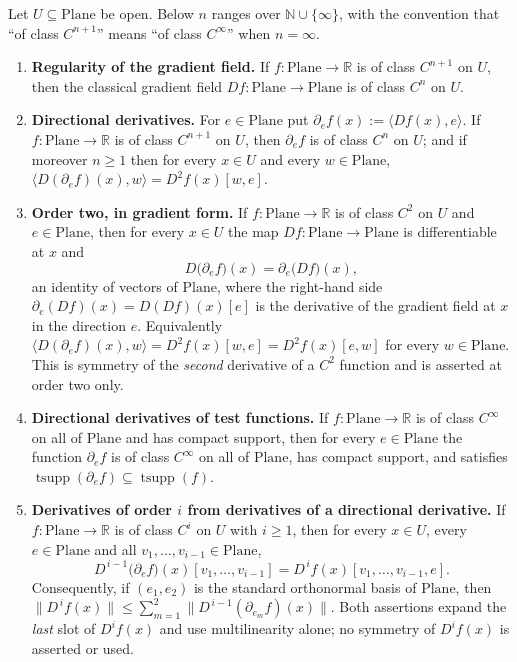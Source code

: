 \begin{proposition}
Let $U\subseteq\mathrm{Plane}$ be open.  Below $n$ ranges over $\mathbb{N}\cup\{\infty\}$, with
the convention that ``of class $C^{n+1}$'' means ``of class $C^{\infty}$'' when $n=\infty$.
\begin{enumerate}
\item \textbf{Regularity of the gradient field.}  If $f\colon\mathrm{Plane}\to\mathbb{R}$ is of
class $C^{n+1}$ on $U$, then the classical gradient field $Df\colon\mathrm{Plane}\to
\mathrm{Plane}$ is of class $C^{n}$ on $U$.
\item \textbf{Directional derivatives.}  For $e\in\mathrm{Plane}$ put
$\partial_ef(x):=\langle Df(x),e\rangle$.  If $f\colon\mathrm{Plane}\to\mathbb{R}$ is of class
$C^{n+1}$ on $U$, then $\partial_ef$ is of class $C^{n}$ on $U$; and if moreover $n\ge1$ then
for every $x\in U$ and every $w\in\mathrm{Plane}$,
$\bigl\langle D(\partial_ef)(x),w\bigr\rangle=D^{2}f(x)[w,e]$.
\item \textbf{Order two, in gradient form.}  If $f\colon\mathrm{Plane}\to\mathbb{R}$ is of
class $C^{2}$ on $U$ and $e\in\mathrm{Plane}$, then for every $x\in U$ the map
$Df\colon\mathrm{Plane}\to\mathrm{Plane}$ is differentiable at $x$ and
\[
  D\bigl(\partial_ef\bigr)(x)=\partial_e\bigl(Df\bigr)(x),
\]
an identity of vectors of $\mathrm{Plane}$, where the right-hand side
$\partial_e(Df)(x)=D(Df)(x)[e]$ is the derivative of the gradient field at $x$ in the
direction $e$.  Equivalently
$\bigl\langle D(\partial_ef)(x),w\bigr\rangle=D^{2}f(x)[w,e]=D^{2}f(x)[e,w]$ for every
$w\in\mathrm{Plane}$.  This is symmetry of the \emph{second} derivative of a $C^{2}$ function
and is asserted at order two only.
\item \textbf{Directional derivatives of test functions.}  If
$f\colon\mathrm{Plane}\to\mathbb{R}$ is of class $C^{\infty}$ on all of $\mathrm{Plane}$ and
has compact support, then for every $e\in\mathrm{Plane}$ the function $\partial_ef$ is of class
$C^{\infty}$ on all of $\mathrm{Plane}$, has compact support, and satisfies
$\operatorname{tsupp}(\partial_ef)\subseteq\operatorname{tsupp}(f)$.
\item \textbf{Derivatives of order $i$ from derivatives of a directional derivative.}  If
$f\colon\mathrm{Plane}\to\mathbb{R}$ is of class $C^{i}$ on $U$ with $i\ge1$, then for every
$x\in U$, every $e\in\mathrm{Plane}$ and all $v_1,\ldots,v_{i-1}\in\mathrm{Plane}$,
\[
  D^{\,i-1}\bigl(\partial_ef\bigr)(x)[v_1,\ldots,v_{i-1}]
  =D^{\,i}f(x)[v_1,\ldots,v_{i-1},e].
\]
Consequently, if $(e_1,e_2)$ is the standard orthonormal basis of $\mathrm{Plane}$, then
$\bigl\lVert D^{\,i}f(x)\bigr\rVert\le\sum_{m=1}^{2}
  \bigl\lVert D^{\,i-1}(\partial_{e_m}f)(x)\bigr\rVert$.
Both assertions expand the \emph{last} slot of $D^{i}f(x)$ and use multilinearity alone; no
symmetry of $D^{i}f(x)$ is asserted or used.
\end{enumerate}
\end{proposition}

